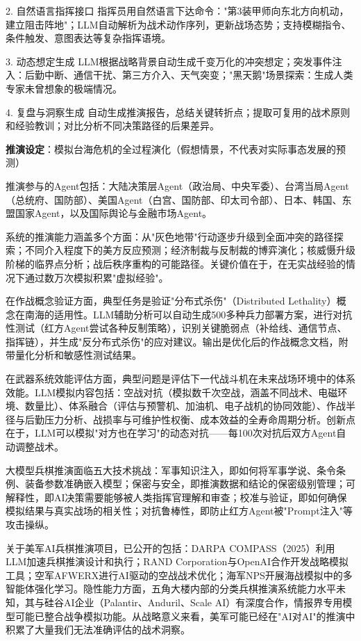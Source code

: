 2. 自然语言指挥接口
指挥员用自然语言下达命令："第3装甲师向东北方向机动，建立阻击阵地"；LLM自动解析为战术动作序列，更新战场态势；支持模糊指令、条件触发、意图表达等复杂指挥语境。

3. 动态想定生成
LLM根据战略背景自动生成千变万化的冲突想定；突发事件注入：后勤中断、通信干扰、第三方介入、天气突变；"黑天鹅"场景探索：生成人类专家未曾想象的极端情况。

4. 复盘与洞察生成
自动生成推演报告，总结关键转折点；提取可复用的战术原则和经验教训；对比分析不同决策路径的后果差异。

\textbf{推演设定}：模拟台海危机的全过程演化（假想情景，不代表对实际事态发展的预测）

推演参与的Agent包括：大陆决策层Agent（政治局、中央军委）、台湾当局Agent（总统府、国防部）、美国Agent（白宫、国防部、印太司令部）、日本、韩国、东盟国家Agent，以及国际舆论与金融市场Agent。

系统的推演能力涵盖多个方面：从"灰色地带"行动逐步升级到全面冲突的路径探索；不同介入程度下的美方反应预测；经济制裁与反制裁的博弈演化；核威慑升级阶梯的临界点分析；战后秩序重构的可能路径。关键价值在于，在无实战经验的情况下通过数万次模拟积累"虚拟经验"。

在作战概念验证方面，典型任务是验证"分布式杀伤"（Distributed Lethality）概念在南海的适用性。LLM辅助分析可以自动生成500多种兵力部署方案，进行对抗性测试（红方Agent尝试各种反制策略），识别关键脆弱点（补给线、通信节点、指挥链），并生成"反分布式杀伤"的应对建议。输出是优化后的作战概念文档，附带量化分析和敏感性测试结果。

在武器系统效能评估方面，典型问题是评估下一代战斗机在未来战场环境中的体系效能。LLM模拟内容包括：空战对抗（模拟数千次空战，涵盖不同战术、电磁环境、数量比）、体系融合（评估与预警机、加油机、电子战机的协同效能）、作战半径与后勤压力分析、战损率与可维护性权衡、成本效益的全寿命周期分析。创新点在于，LLM可以模拟"对方也在学习"的动态对抗——每100次对抗后双方Agent自动调整战术。

大模型兵棋推演面临五大技术挑战：军事知识注入，即如何将军事学说、条令条例、装备参数准确嵌入模型；保密与安全，即推演数据和结论的保密级别管理；可解释性，即AI决策需要能够被人类指挥官理解和审查；校准与验证，即如何确保模拟结果与真实战场的相关性；对抗鲁棒性，即防止红方Agent被"Prompt注入"等攻击操纵。

关于美军AI兵棋推演项目，已公开的包括：DARPA COMPASS（2025）利用LLM加速兵棋推演设计和执行；RAND Corporation与OpenAI合作开发战略模拟工具；空军AFWERX进行AI驱动的空战战术优化；海军NPS开展海战模拟中的多智能体强化学习。隐性能力方面，五角大楼内部的分类兵棋推演系统能力水平未知，其与硅谷AI企业（Palantir、Anduril、Scale AI）有深度合作，情报界专用模型可能已整合战争模拟功能。从战略意义来看，美军可能已经在"AI对AI"的推演中积累了大量我们无法准确评估的战术洞察。

